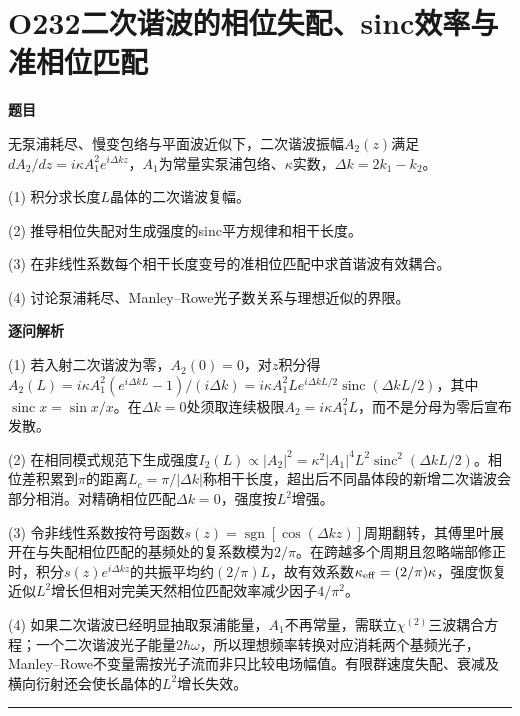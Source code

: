 \documentclass[UTF8,a4paper,11pt,oneside,openany]{ctexbook}
\begin{document}
\section*{O232\quad 二次谐波的相位失配、sinc效率与准相位匹配}
\textbf{题目}\par
无泵浦耗尽、慢变包络与平面波近似下，二次谐波振幅$A_2(z)$满足$dA_2/dz=i\kappa A_1^2 e^{i\Delta k z}$，$A_1$为常量实泵浦包络、$\kappa$实数，$\Delta k=2k_1-k_2$。
\par\smallskip\noindent (1) 积分求长度$L$晶体的二次谐波复幅。
\par\smallskip\noindent (2) 推导相位失配对生成强度的sinc平方规律和相干长度。
\par\smallskip\noindent (3) 在非线性系数每个相干长度变号的准相位匹配中求首谐波有效耦合。
\par\smallskip\noindent (4) 讨论泵浦耗尽、Manley–Rowe光子数关系与理想近似的界限。
\par\medskip\textbf{逐问解析}\par
\par\smallskip\noindent (1) 若入射二次谐波为零，$A_2(0)=0$，对$z$积分得$A_2(L)=i\kappa A_1^2(e^{i\Delta kL}-1)/(i\Delta k)=i\kappa A_1^2 L e^{i\Delta k L/2}\operatorname{sinc}(\Delta k L/2)$，其中$\operatorname{sinc}x=\sin x/x$。在$\Delta k=0$处须取连续极限$A_2=i\kappa A_1^2 L$，而不是分母为零后宣布发散。
\par\smallskip\noindent (2) 在相同模式规范下生成强度$I_2(L)\propto|A_2|^2=\kappa^2|A_1|^4L^2\operatorname{sinc}^2(\Delta kL/2)$。相位差积累到$\pi$的距离$L_c=\pi/|\Delta k|$称相干长度，超出后不同晶体段的新增二次谐波会部分相消。对精确相位匹配$\Delta k=0$，强度按$L^2$增强。
\par\smallskip\noindent (3) 令非线性系数按符号函数$s(z)=\operatorname{sgn}[\cos(\Delta k z)]$周期翻转，其傅里叶展开在与失配相位匹配的基频处的复系数模为$2/\pi$。在跨越多个周期且忽略端部修正时，积分$s(z)e^{i\Delta kz}$的共振平均约$(2/\pi)L$，故有效系数$\kappa_{\rm eff}=(2/\pi)\kappa$，强度恢复近似$L^2$增长但相对完美天然相位匹配效率减少因子$4/\pi^2$。
\par\smallskip\noindent (4) 如果二次谐波已经明显抽取泵浦能量，$A_1$不再常量，需联立$\chi^{(2)}$三波耦合方程；一个二次谐波光子能量$2\hbar\omega$，所以理想频率转换对应消耗两个基频光子，Manley–Rowe不变量需按光子流而非只比较电场幅值。有限群速度失配、衰减及横向衍射还会使长晶体的$L^2$增长失效。
\par\medskip\hrule\medskip
\end{document}
